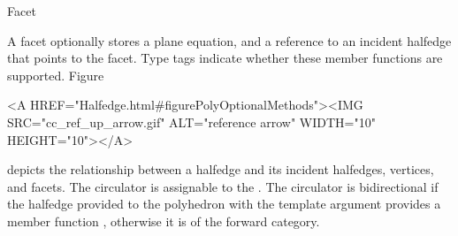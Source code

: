 
\ccRefPageBegin



\begin{ccRefClass}{Facet}

\ccDefinition
  
A facet optionally stores a plane equation, and a reference to an 
incident halfedge that points to the facet. Type tags indicate whether 
these member functions are supported.  
Figure~\begin{ccHtmlOnly}
  <A HREF="Halfedge.html#figurePolyOptionalMethods"><IMG
  SRC="cc_ref_up_arrow.gif" ALT="reference arrow" WIDTH="10" HEIGHT="10"></A>
\end{ccHtmlOnly}
depicts the relationship between a halfedge and its incident
halfedges, vertices, and facets. The circulator is assignable to the
. The circulator is bidirectional if the
halfedge provided to the polyhedron with the  template
argument provides a member function , otherwise it is
of the forward category.



\ccTypes
{}
\ccThreeToTwo

\ccGlue
{}
\ccGlue
{}

\ccGlue
{}
\ccGlue
{}
\ccGlue
{}

\ccGlue
{}
\ccGlue
{}
\ccGlue
{}


\end{ccRefClass}
